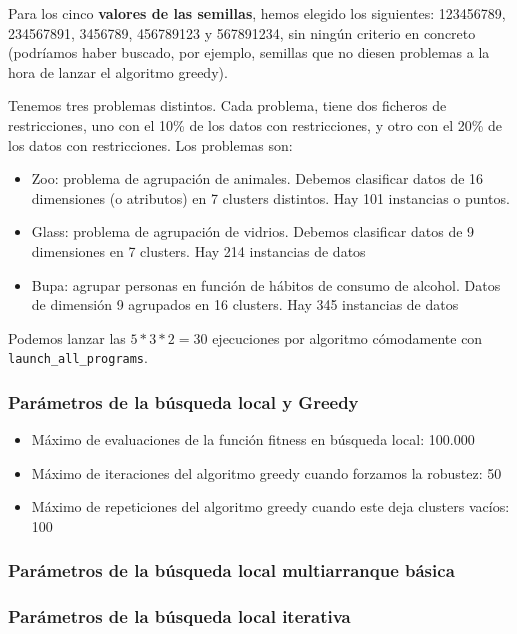 \documentclass[11pt]{article}
\begin{document}
Para los cinco \textbf{valores de las semillas}, hemos elegido los siguientes: 123456789, 234567891, 3456789, 456789123 y 567891234, sin ningún criterio en concreto (podríamos haber buscado, por ejemplo, semillas que no diesen problemas a la hora de lanzar el algoritmo greedy).

Tenemos tres problemas distintos. Cada problema, tiene dos ficheros de restricciones, uno con el 10\% de los datos con restricciones, y otro con el 20\% de los datos con restricciones. Los problemas son:

\begin{itemize}
    \item Zoo: problema de agrupación de animales. Debemos clasificar datos de 16 dimensiones (o atributos) en 7 clusters distintos. Hay 101 instancias o puntos.
    \item Glass: problema de agrupación de vidrios. Debemos clasificar datos de 9 dimensiones en 7 clusters. Hay 214 instancias de datos
    \item Bupa: agrupar personas en función de hábitos de consumo de alcohol. Datos de dimensión 9 agrupados en 16 clusters. Hay 345 instancias de datos
\end{itemize}

Podemos lanzar las $5 * 3 * 2 = 30$ ejecuciones por algoritmo cómodamente con \lstinline{launch_all_programs}.

\subsubsection{Parámetros de la búsqueda local y Greedy}

\begin{itemize}
\item Máximo de evaluaciones de la función fitness en búsqueda local: 100.000
    \item Máximo de iteraciones del algoritmo greedy cuando forzamos la robustez: 50
    \item Máximo de repeticiones del algoritmo greedy cuando este deja clusters vacíos: 100
\end{itemize}

\subsubsection{Parámetros de la búsqueda local multiarranque básica} \label{parametros_blm}
\subsubsection{Parámetros de la búsqueda local iterativa} \label{parametros_ils}
\end{document}
